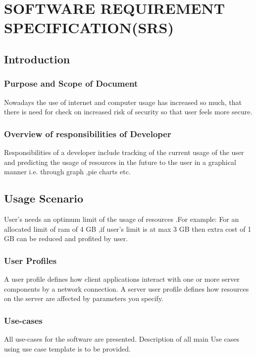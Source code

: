 \documentclass[12pt,a4paper]{report}
\begin{document}
\chapter{SOFTWARE REQUIREMENT SPECIFICATION(SRS)}
\newpage
\section{Introduction}
\subsection{Purpose and Scope of Document}
Nowadays the use of internet and computer usage has increased so much, that there is need for check on  increased risk of security so that user feels more secure. 
\subsection{Overview of responsibilities of Developer}
Responsibilities of a developer include tracking of the current usage of the user and predicting the usage of resources in the future to the user in a graphical manner i.e. through graph ,pie charts etc.
\section{Usage Scenario}
User's needs an optimum limit of the usage of resources .For example: For an allocated limit of ram of 4 GB ,if user's limit is at max 3 GB then extra cost of 1 GB can be reduced and profited by user.
\subsection{User Profiles}
A user profile defines how client applications interact with one or more server components by a network connection. A server user profile defines how resources on the server are affected by parameters you specify.
\subsection{Use-cases}
All use-cases for the software are presented. Description of all main Use cases using use case template is to be provided.
\end{document}
